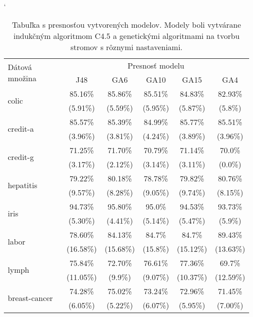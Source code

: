 \begin{table}[t]
\catcode`
\centering 
\newcommand\T{\rule{0pt}{2.6ex}}       %
\newcommand\B{\rule[-1.2ex]{0pt}{0pt}} %
\begin{tabular}{|l||c|c|c|c|c||}
\hline \multirow{2}{*}{Dátová množina} & \multicolumn{5}{c||}{Presnosť modelu} \\ 
\cline{2-6} & J48 & GA6 & GA10 & GA15 & GA4 \\
\hline
\hline \multirow{2}{*}{colic} & 85.16\% & 85.86\% & 85.51\% & 84.83\% & 82.93\% \T\\[-1.5ex]
& \tiny (5.91\%) & \tiny (5.59\%) & \tiny (5.95\%) & \tiny (5.87\%) & \tiny (5.8\%)\B\\
\hline \multirow{2}{*}{credit-a} & 85.57\% & 85.39\% & 84.99\% & 85.77\% & 85.51\% \T\\[-1.5ex]
& \tiny (3.96\%) & \tiny (3.81\%) & \tiny (4.24\%) & \tiny (3.89\%) & \tiny (3.96\%)\B\\
\hline \multirow{2}{*}{credit-g} & 71.25\% & 71.70\% & 70.79\% & 71.14\% & 70.0\%\T\\[-1.5ex]
& \tiny (3.17\%) & \tiny (2.12\%) & \tiny (3.14\%) & \tiny (3.11\%) & \tiny (0.0\%)\B\\
\hline \multirow{2}{*}{hepatitis} & 79.22\% & 80.18\% & 78.78\% & 79.82\% & 80.76\% \T\\[-1.5ex]
& \tiny (9.57\%) & \tiny (8.28\%) & \tiny (9.05\%) & \tiny (9.74\%) & \tiny (8.15\%)\B\\
\hline \multirow{2}{*}{iris} & 94.73\% & 95.80\% & 95.0\% & 94.53\% & 93.73\% \T\\[-1.5ex]
& \tiny (5.30\%) & \tiny (4.41\%) & \tiny (5.14\%) & \tiny (5.47\%) & \tiny (5.9\%)\B\\
\hline \multirow{2}{*}{labor} & 78.60\% & 84.13\% & 84.7\% & 84.7\% & 89.43\% \T\\[-1.5ex]
& \tiny (16.58\%) & \tiny (15.68\%) & \tiny (15.8\%) & \tiny (15.12\%) & \tiny (13.63\%)\B\\
\hline \multirow{2}{*}{lymph} & 75.84\% & 72.70\% & 76.61\% & 77.36\% & 69.7\% \T\\[-1.5ex]
& \tiny (11.05\%) & \tiny (9.9\%) & \tiny (9.07\%) & \tiny (10.37\%) & \tiny (12.59\%)\B\\
\hline \multirow{2}{*}{breast-cancer} & 74.28\% & 75.02\% & 73.24\% & 72.96\% & 71.45\% \T\\[-1.5ex]
& \tiny (6.05\%) & \tiny (5.22\%) & \tiny (6.07\%) & \tiny (5.95\%) & \tiny (7.00\%)\B\\
\hline
\end{tabular}
\caption{Tabuľka s presnosťou vytvorených modelov. Modely boli vytvárane indukčným algoritmom C4.5 a genetickými algoritmami na tvorbu stromov s rôznymi nastaveniami. }\label{fig:acc}
\end{table}


